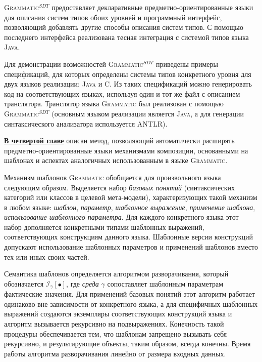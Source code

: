\documentclass[12pt,a4paper]{article}
\newcommand{\term}[1]{\emph{#1}}
\newcommand{\tool}[1]{\textsc{#1}}
\theoremstyle{definition}
\theoremstyle{plain}
\newcommand{\GRM}{\tool{Grammatic}}
\newcommand{\ATF}{\tool{Grammatic$^{SDT}$}}
\newcommand{\Inst}[2]{\mathcal{I}_{#1} \left[ #2 \right]}%
\newcommand{\afsubsection}[1]{\par \textbf{\underline{#1}}}
\begin{document}
\ATF{} предоставляет декларативные предметно-ориентированные языки для описания систем типов обоих уровней и программный интерфейс, позволяющий добавлять другие способы описания систем типов. С помощью последнего интерфейса реализована тесная интеграция с системой типов языка \tool{Java}.

Для демонстрации возможностей \ATF{} приведены примеры спецификаций, для которых определены системы типов конкретного уровня для двух языков реализации: \tool{Java} и \tool{C}. Из таких спецификаций можно генерировать код на соответствующих языках, используя один и тот же файл с описанием транслятора. Транслятор языка \GRM{} был реализован с помощью \ATF{} (основным языком реализации является \tool{Java}, а для генерации синтаксического анализатора используется \tool{ANTLR}).

\renewcommand{\thepart}{4}
\afsubsection{В четвертой главе} описан метод, позволяющий автоматически расширять предметно-ориентированные языки механизмами композиции, основанными на шаблонах и аспектах аналогичных использованным в языке \GRM{}. 

Механизм шаблонов \GRM{} обобщается для произвольного языка следующим образом. Выделяется набор \term{базовых понятий} (синтаксических категорий или классов в целевой мета-модели), характеризующих такой механизм в любом языке: \term{шаблон}, \term{параметр}, \term{шаблонное выражение}, \term{применение шаблона}, \term{использование шаблонного параметра}. Для каждого конкретного языка этот набор дополняется конкретными типами шаблонных выражений, соответствующих конструкциям данного языка. Шаблонные версии конструкций допускают использование шаблонных параметров и применений шаблонов вместо тех или иных своих частей. 

Семантика шаблонов определяется алгоритмом разворачивания, который обозначается $\Inst{\gamma}{\bullet}$, где \term{среда} $\gamma$ сопоставляет шаблонным параметрам фактические значения. Для применений базовых понятий этот алгоритм работает одинаково вне зависимости от конкретного языка, а для специфичных шаблонных выражений создаются экземпляры соответствующих конструкций языка и алгоритм вызывается рекурсивно на подвыражениях. Конечность такой процедуры обеспечивается тем, что шаблонам запрещено вызывать себя рекурсивно, и результирующие объекты, таким образом, всегда конечны. Время работы алгоритма разворачивания линейно от размера входных данных.
\end{document}
